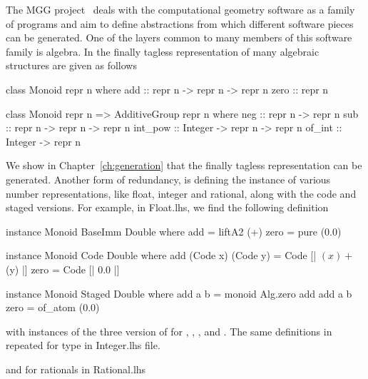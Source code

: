 The MGG project~\cite{carette2011generative} deals with the computational geometry software as a family of programs and aim to define abstractions from which different software pieces can be generated. One of the layers common to many members of this software family is algebra. In  the finally tagless representation of many algebraic structures are given as follows 
\begin{hscode}
class Monoid repr n where
  add :: repr n -> repr n -> repr n
  zero :: repr n

class Monoid repr n => AdditiveGroup repr n where
  neg :: repr n -> repr n
  sub :: repr n -> repr n -> repr n
  int_pow :: Integer -> repr n -> repr n
  of_int :: Integer -> repr n
\end{hscode}
We show in Chapter~\ref{ch:generation} that the finally tagless representation can be generated. Another form of redundancy, is defining the  instance of various number representations, like float, integer and rational, along with the code and staged versions. For example, in Float.lhs, we find the following definition 
\begin{hscode}
instance Monoid BaseImm Double where
  add = liftA2 (+)
  zero = pure (0.0)

instance Monoid Code Double where
  add (Code x) (Code y) = Code [| $(x) + $(y) |]
  zero = Code [| 0.0 |]

instance Monoid Staged Double where
  add a b = monoid Alg.zero add add a b
  zero = of_atom (0.0)
\end{hscode}
with instances of the three version of  for , , , and . The same definitions in repeated for  type in Integer.lhs file. 
and for rationals in Rational.lhs



